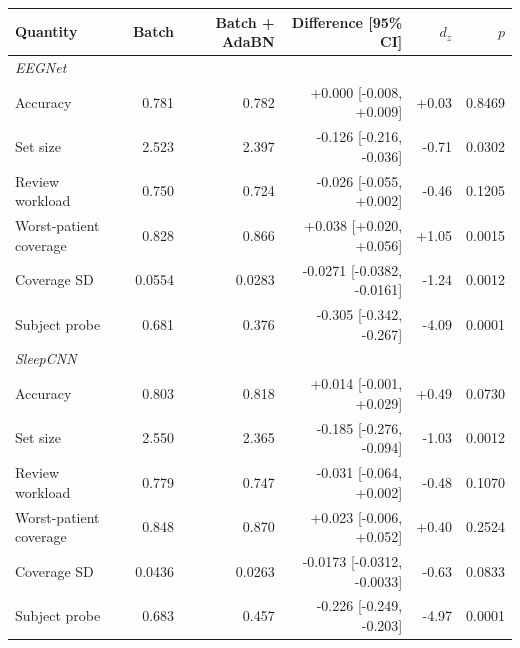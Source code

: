 \begin{tabular}{lrrrrr}
\toprule
Quantity & Batch & Batch + AdaBN & Difference [95\% CI] & $d_z$ & $p$ \\
\midrule
\multicolumn{6}{l}{\emph{EEGNet}}\\
Accuracy & 0.781 & 0.782 & +0.000 [-0.008, +0.009] & +0.03 & 0.8469 \\
Set size & 2.523 & 2.397 & -0.126 [-0.216, -0.036] & -0.71 & 0.0302 \\
Review workload & 0.750 & 0.724 & -0.026 [-0.055, +0.002] & -0.46 & 0.1205 \\
Worst-patient coverage & 0.828 & 0.866 & +0.038 [+0.020, +0.056] & +1.05 & 0.0015 \\
Coverage SD & 0.0554 & 0.0283 & -0.0271 [-0.0382, -0.0161] & -1.24 & 0.0012 \\
Subject probe & 0.681 & 0.376 & -0.305 [-0.342, -0.267] & -4.09 & 0.0001 \\
\midrule
\multicolumn{6}{l}{\emph{SleepCNN}}\\
Accuracy & 0.803 & 0.818 & +0.014 [-0.001, +0.029] & +0.49 & 0.0730 \\
Set size & 2.550 & 2.365 & -0.185 [-0.276, -0.094] & -1.03 & 0.0012 \\
Review workload & 0.779 & 0.747 & -0.031 [-0.064, +0.002] & -0.48 & 0.1070 \\
Worst-patient coverage & 0.848 & 0.870 & +0.023 [-0.006, +0.052] & +0.40 & 0.2524 \\
Coverage SD & 0.0436 & 0.0263 & -0.0173 [-0.0312, -0.0033] & -0.63 & 0.0833 \\
Subject probe & 0.683 & 0.457 & -0.226 [-0.249, -0.203] & -4.97 & 0.0001 \\
\bottomrule
\end{tabular}